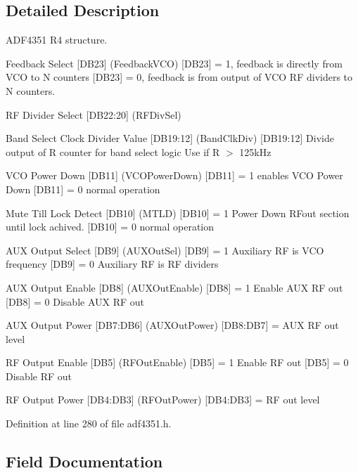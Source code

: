 \subsection{Detailed Description}
A\+D\+F4351 R4 structure. 

Feedback Select \mbox{[}D\+B23\mbox{]} (Feedback\+V\+CO) \mbox{[}D\+B23\mbox{]} = 1, feedback is directly from V\+CO to N counters \mbox{[}D\+B23\mbox{]} = 0, feedback is from output of V\+CO RF dividers to N counters.

RF Divider Select \mbox{[}D\+B22\+:20\mbox{]} (R\+F\+Div\+Sel)

Band Select Clock Divider Value \mbox{[}D\+B19\+:12\mbox{]} (Band\+Clk\+Div) \mbox{[}D\+B19\+:12\mbox{]} Divide output of R counter for band select logic Use if R $>$ 125k\+Hz

V\+CO Power Down \mbox{[}D\+B11\mbox{]} (V\+C\+O\+Power\+Down) \mbox{[}D\+B11\mbox{]} = 1 enables V\+CO Power Down \mbox{[}D\+B11\mbox{]} = 0 normal operation

Mute Till Lock Detect \mbox{[}D\+B10\mbox{]} (M\+T\+LD) \mbox{[}D\+B10\mbox{]} = 1 Power Down R\+Fout section until lock achived. \mbox{[}D\+B10\mbox{]} = 0 normal operation

A\+UX Output Select \mbox{[}D\+B9\mbox{]} (A\+U\+X\+Out\+Sel) \mbox{[}D\+B9\mbox{]} = 1 Auxiliary RF is V\+CO frequency \mbox{[}D\+B9\mbox{]} = 0 Auxiliary RF is RF dividers

A\+UX Output Enable \mbox{[}D\+B8\mbox{]} (A\+U\+X\+Out\+Enable) \mbox{[}D\+B8\mbox{]} = 1 Enable A\+UX RF out \mbox{[}D\+B8\mbox{]} = 0 Disable A\+UX RF out

A\+UX Output Power \mbox{[}D\+B7\+:D\+B6\mbox{]} (A\+U\+X\+Out\+Power) \mbox{[}D\+B8\+:D\+B7\mbox{]} = A\+UX RF out level

RF Output Enable \mbox{[}D\+B5\mbox{]} (R\+F\+Out\+Enable) \mbox{[}D\+B5\mbox{]} = 1 Enable RF out \mbox{[}D\+B5\mbox{]} = 0 Disable RF out

RF Output Power \mbox{[}D\+B4\+:D\+B3\mbox{]} (R\+F\+Out\+Power) \mbox{[}D\+B4\+:D\+B3\mbox{]} = RF out level 

Definition at line 280 of file adf4351.\+h.



\subsection{Field Documentation}
